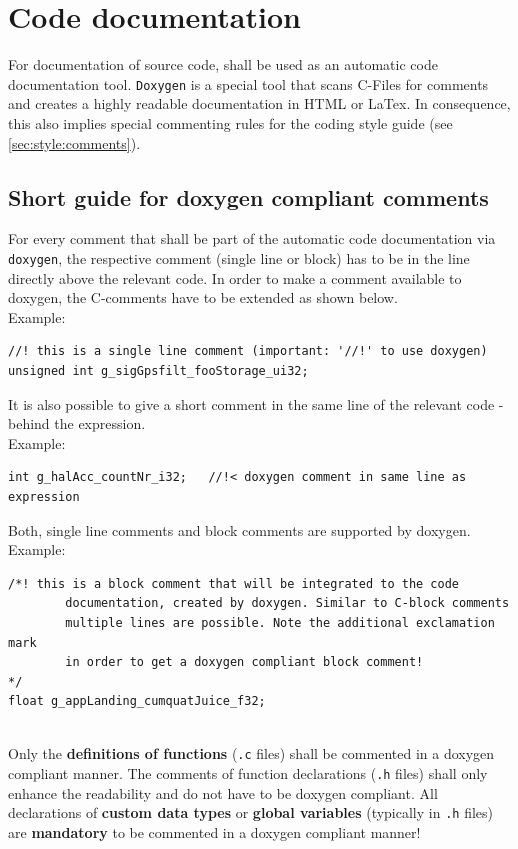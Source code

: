 \chapter{Code documentation}
\label{sec:doxygen}
For documentation of source code, \texttt{} shall be used as an automatic code documentation tool. \texttt{Doxygen} is a special tool that scans C-Files for comments and creates a highly readable documentation in HTML or LaTex. In consequence, this also implies special commenting rules for the coding style guide (see \ref{sec:style:comments}).

\section*{Short guide for doxygen compliant comments}
\label{sec:doxygen:guide}
For every comment that shall be part of the automatic code documentation via \texttt{doxygen}, the respective comment (single line or block) has to be in the line directly above the relevant code. In order to make a comment available to doxygen, the C-comments have to be extended as shown below.\\
Example:
\begin{lstlisting}
//! this is a single line comment (important: '//!' to use doxygen)
unsigned int g_sigGpsfilt_fooStorage_ui32;
\end{lstlisting}

It is also possible to give a short comment in the same line of the relevant code - behind the expression.\\
Example:
\begin{lstlisting}
int g_halAcc_countNr_i32;	//!< doxygen comment in same line as expression
\end{lstlisting}

Both, single line comments and block comments are supported by doxygen.\\
Example:
\begin{lstlisting}
/*! this is a block comment that will be integrated to the code
		documentation, created by doxygen. Similar to C-block comments
		multiple lines are possible. Note the additional exclamation mark 
		in order to get a doxygen compliant block comment!
*/
float g_appLanding_cumquatJuice_f32;
\end{lstlisting}

\\
Only the \textbf{definitions of functions} (\texttt{.c} files) shall be commented in a doxygen compliant manner. The comments of function declarations (\texttt{.h} files) shall only enhance the readability and do not have to be doxygen compliant. All declarations of \textbf{custom data types} or \textbf{global variables} (typically in \texttt{.h} files) are \textbf{mandatory} to be commented in a doxygen compliant manner!

